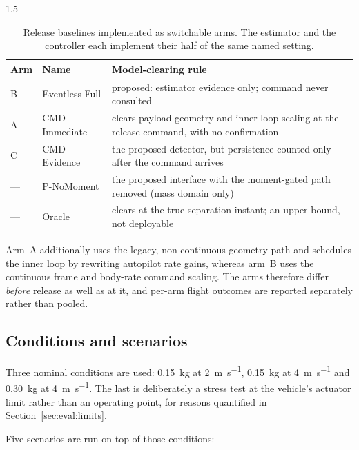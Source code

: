 \begin{spacing}{1.5}
\begin{table}[ht]
\centering
\caption{Release baselines implemented as switchable arms. The estimator and the
controller each implement their half of the same named setting.}
\label{tab:arms}
\small
\begin{tabularx}{\textwidth}{@{}l l X@{}}
\toprule
\textbf{Arm} & \textbf{Name} & \textbf{Model-clearing rule} \\
\midrule
B & Eventless-Full & proposed: estimator evidence only; command never consulted \\
A & CMD-Immediate & clears payload geometry and inner-loop scaling at the release command, with no confirmation \\
C & CMD-Evidence & the proposed detector, but persistence counted only after the command arrives \\
--- & P-NoMoment & the proposed interface with the moment-gated path removed (mass domain only) \\
--- & Oracle & clears at the true separation instant; an upper bound, not deployable \\
\bottomrule
\end{tabularx}
\end{table}

Arm~A additionally uses the legacy, non-continuous geometry path and schedules
the inner loop by rewriting autopilot rate gains, whereas arm~B uses the
continuous frame and body-rate command scaling. The arms therefore differ
\emph{before} release as well as at it, and per-arm flight outcomes are reported
separately rather than pooled.

\subsection{Conditions and scenarios}\label{sec:eval:conditions}

Three nominal conditions are used: \SI{0.15}{\kg} at \SI{2}{\meter\per\second},
\SI{0.15}{\kg} at \SI{4}{\meter\per\second} and \SI{0.30}{\kg} at
\SI{4}{\meter\per\second}. The last is deliberately a stress test at the
vehicle's actuator limit rather than an operating point, for reasons quantified
in Section~\ref{sec:eval:limits}.

Five scenarios are run on top of those conditions:


\end{spacing}
